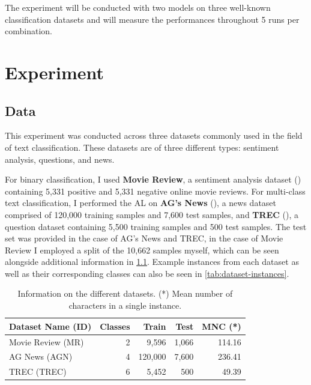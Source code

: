 \documentclass[english,bachelor,ul]{webisthesis} %
\begin{document}
The experiment will be conducted with two models on three well-known classification datasets and will measure the performances throughout 5 runs per combination. 

\chapter{Experiment}

\section{Data}

This experiment was conducted across three datasets commonly used in the field of text classification. These datasets are of three different types: sentiment analysis, questions, and news. 

For binary classification, I used \textbf{Movie Review}, a sentiment analysis dataset (\cite{DBLP:conf/acl/PangL05}) containing 5,331 positive and 5,331 negative online movie reviews. For multi-class text classification, I performed the AL on \textbf{AG's News} (\cite{DBLP:conf/nips/ZhangZL15}), a news dataset comprised of 120,000 training samples and 7,600 test samples, and \textbf{TREC} (\cite{DBLP:journals/nle/LiR06}), a question dataset containing 5,500 training samples and 500 test samples. The test set was provided in the case of AG's News and TREC, in the case of Movie Review I employed a split of the 10,662 samples myself, which can be seen alongside additional information in \ref{tab:dataset-table}. Example instances from each dataset as well as their corresponding classes can also be seen in \ref{tab:dataset-instances}.


\begin{table}[p]%
    \centering
    \setlength{\tabcolsep}{16pt} %
    \begin{tabular}{@{}lrrrr@{}} %
        \toprule
        \bfseries Dataset Name \scriptsize (ID) & \bfseries Classes & \bfseries Train & \bfseries Test & \bfseries MNC (*) \\
        \midrule
        Movie Review \scriptsize (MR) & 2 & 9,596 & 1,066 & 114.16 \\
        AG News \scriptsize (AGN) & 4 & 120,000 & 7,600 &  236.41 \\
        TREC \scriptsize (TREC) & 6 & 5,452 & 500 & 49.39 \\
        \bottomrule
    \end{tabular}
    \caption{Information on the different datasets. (*) Mean number of characters in a single instance.}
  \label{tab:dataset-table}%
\end{table}
\end{document}
